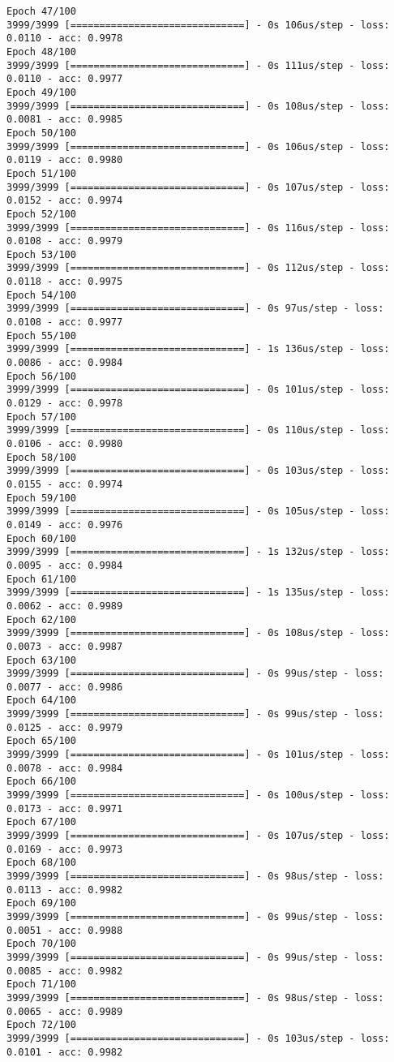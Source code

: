 \documentclass[11pt]{article}
\begin{document}
\begin{Verbatim}[commandchars=\\\{\}]
Epoch 47/100
3999/3999 [==============================] - 0s 106us/step - loss: 0.0110 - acc: 0.9978
Epoch 48/100
3999/3999 [==============================] - 0s 111us/step - loss: 0.0110 - acc: 0.9977
Epoch 49/100
3999/3999 [==============================] - 0s 108us/step - loss: 0.0081 - acc: 0.9985
Epoch 50/100
3999/3999 [==============================] - 0s 106us/step - loss: 0.0119 - acc: 0.9980
Epoch 51/100
3999/3999 [==============================] - 0s 107us/step - loss: 0.0152 - acc: 0.9974
Epoch 52/100
3999/3999 [==============================] - 0s 116us/step - loss: 0.0108 - acc: 0.9979
Epoch 53/100
3999/3999 [==============================] - 0s 112us/step - loss: 0.0118 - acc: 0.9975
Epoch 54/100
3999/3999 [==============================] - 0s 97us/step - loss: 0.0108 - acc: 0.9977
Epoch 55/100
3999/3999 [==============================] - 1s 136us/step - loss: 0.0086 - acc: 0.9984
Epoch 56/100
3999/3999 [==============================] - 0s 101us/step - loss: 0.0129 - acc: 0.9978
Epoch 57/100
3999/3999 [==============================] - 0s 110us/step - loss: 0.0106 - acc: 0.9980
Epoch 58/100
3999/3999 [==============================] - 0s 103us/step - loss: 0.0155 - acc: 0.9974
Epoch 59/100
3999/3999 [==============================] - 0s 105us/step - loss: 0.0149 - acc: 0.9976
Epoch 60/100
3999/3999 [==============================] - 1s 132us/step - loss: 0.0095 - acc: 0.9984
Epoch 61/100
3999/3999 [==============================] - 1s 135us/step - loss: 0.0062 - acc: 0.9989
Epoch 62/100
3999/3999 [==============================] - 0s 108us/step - loss: 0.0073 - acc: 0.9987
Epoch 63/100
3999/3999 [==============================] - 0s 99us/step - loss: 0.0077 - acc: 0.9986
Epoch 64/100
3999/3999 [==============================] - 0s 99us/step - loss: 0.0125 - acc: 0.9979
Epoch 65/100
3999/3999 [==============================] - 0s 101us/step - loss: 0.0078 - acc: 0.9984
Epoch 66/100
3999/3999 [==============================] - 0s 100us/step - loss: 0.0173 - acc: 0.9971
Epoch 67/100
3999/3999 [==============================] - 0s 107us/step - loss: 0.0169 - acc: 0.9973
Epoch 68/100
3999/3999 [==============================] - 0s 98us/step - loss: 0.0113 - acc: 0.9982
Epoch 69/100
3999/3999 [==============================] - 0s 99us/step - loss: 0.0051 - acc: 0.9988
Epoch 70/100
3999/3999 [==============================] - 0s 99us/step - loss: 0.0085 - acc: 0.9982
Epoch 71/100
3999/3999 [==============================] - 0s 98us/step - loss: 0.0065 - acc: 0.9989
Epoch 72/100
3999/3999 [==============================] - 0s 103us/step - loss: 0.0101 - acc: 0.9982

\end{Verbatim}
\end{document}
